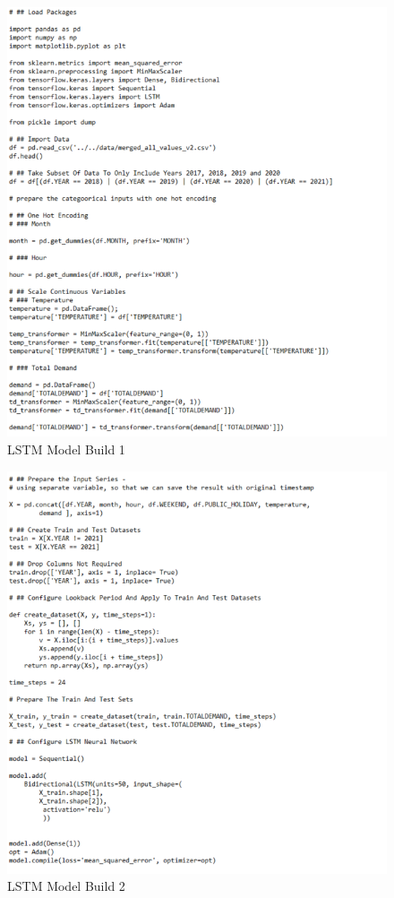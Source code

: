 \documentclass[mstat,12pt]{unswthesis}
\begin{document}
\begin{figure}[H]
\includegraphics{snapshots1/new LSTM_Build_Model_1.png}
\caption{LSTM Model Build 1}\label{ModelBuild1}
\end{figure}

\begin{figure}[H]
\includegraphics{snapshots1/new LSTM_Build_Model_2.png}
\caption{LSTM Model Build 2}\label{ModelBuild2}
\end{figure}
\end{document}
